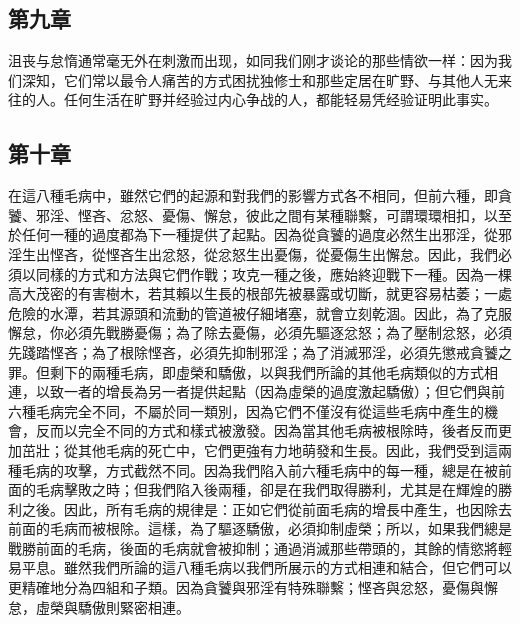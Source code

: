 
\subsection{第九章}

\par

沮丧与怠惰通常毫无外在刺激而出现，如同我们刚才谈论的那些情欲一样：因为我们深知，它们常以最令人痛苦的方式困扰独修士和那些定居在旷野、与其他人无来往的人。任何生活在旷野并经验过内心争战的人，都能轻易凭经验证明此事实。\par


\subsection{第十章}

\par

在這八種毛病中，雖然它們的起源和對我們的影響方式各不相同，但前六種，即貪饕、邪淫、悭吝、忿怒、憂傷、懈怠，彼此之間有某種聯繫，可謂環環相扣，以至於任何一種的過度都為下一種提供了起點。因為從貪饕的過度必然生出邪淫，從邪淫生出悭吝，從悭吝生出忿怒，從忿怒生出憂傷，從憂傷生出懈怠。因此，我們必須以同樣的方式和方法與它們作戰；攻克一種之後，應始終迎戰下一種。因為一棵高大茂密的有害樹木，若其賴以生長的根部先被暴露或切斷，就更容易枯萎；一處危險的水潭，若其源頭和流動的管道被仔細堵塞，就會立刻乾涸。因此，為了克服懈怠，你必須先戰勝憂傷；為了除去憂傷，必須先驅逐忿怒；為了壓制忿怒，必須先踐踏悭吝；為了根除悭吝，必須先抑制邪淫；為了消滅邪淫，必須先懲戒貪饕之罪。但剩下的兩種毛病，即虛榮和驕傲，以與我們所論的其他毛病類似的方式相連，以致一者的增長為另一者提供起點（因為虛榮的過度激起驕傲）；但它們與前六種毛病完全不同，不屬於同一類別，因為它們不僅沒有從這些毛病中產生的機會，反而以完全不同的方式和樣式被激發。因為當其他毛病被根除時，後者反而更加茁壯；從其他毛病的死亡中，它們更強有力地萌發和生長。因此，我們受到這兩種毛病的攻擊，方式截然不同。因為我們陷入前六種毛病中的每一種，總是在被前面的毛病擊敗之時；但我們陷入後兩種，卻是在我們取得勝利，尤其是在輝煌的勝利之後。因此，所有毛病的規律是：正如它們從前面毛病的增長中產生，也因除去前面的毛病而被根除。這樣，為了驅逐驕傲，必須抑制虛榮；所以，如果我們總是戰勝前面的毛病，後面的毛病就會被抑制；通過消滅那些帶頭的，其餘的情慾將輕易平息。雖然我們所論的這八種毛病以我們所展示的方式相連和結合，但它們可以更精確地分為四組和子類。因為貪饕與邪淫有特殊聯繫；悭吝與忿怒，憂傷與懈怠，虛榮與驕傲則緊密相連。\par

